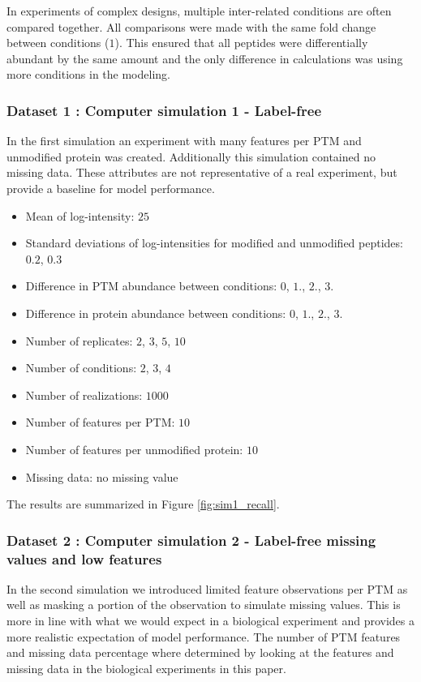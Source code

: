 \documentclass{mcp}
\begin{document}
In experiments of complex designs, multiple inter-related conditions are often compared together. All comparisons were made with the same fold change between conditions ($1$). This ensured that all peptides were differentially abundant by the same amount and the only difference in calculations was using more conditions in the modeling.

\subsubsection{Dataset 1 : Computer simulation 1 - Label-free}
\label{sec:dataset1}
In the first simulation an experiment with many features per PTM and unmodified protein was created. Additionally this simulation contained no missing data. These attributes are not representative of a real experiment, but provide a baseline for model performance.

\begin{itemize}
\item Mean of log-intensity: $25$
\item Standard deviations of log-intensities for modified and unmodified peptides: $0.2$, $0.3$
\item Difference in PTM abundance between conditions: $0$, $1.$, $2.$, $3.$
\item Difference in protein abundance between conditions: $0$, $1.$, $2.$, $3.$
\item Number of replicates: $2$, $3$, $5$, $10$
\item Number of conditions: $2$, $3$, $4$
\item Number of realizations: $1000$
\item Number of features per PTM: $10$
\item Number of features per unmodified protein: $10$
\item Missing data: no missing value
\end{itemize}

The results are summarized in Figure \ref{fig:sim1_recall}.

\subsubsection{Dataset 2 : Computer simulation 2 - Label-free missing values and low features}
\label{sec:dataset2}

In the second simulation we introduced limited feature observations per PTM as well as masking a portion of the observation to simulate missing values. This is more in line with what we would expect in a biological experiment and provides a more realistic expectation of model performance. The number of PTM features and missing data percentage where determined by looking at the features and missing data in the biological experiments in this paper.
\end{document}
